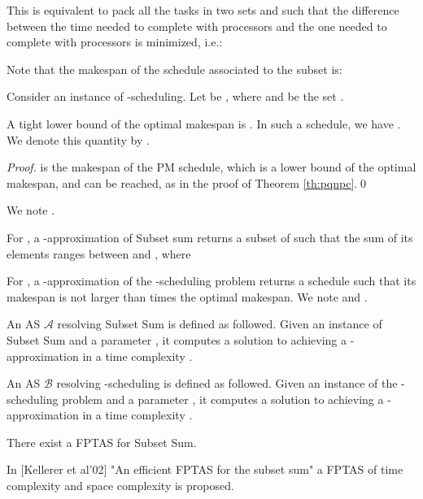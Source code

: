\documentclass{llncs}
\newcommand{\A}{\ensuremath{\mathcal A}\xspace}
\newcommand{\B}{\ensuremath{\mathcal B}\xspace}
\newcommand{\ek}{\varepsilon_{\kappa}}
\begin{document}
This is equivalent to pack all the tasks in two sets  and  such that the difference between the time needed to complete  with  processors and the one needed to complete  with  processors is minimized, i.e.:




Note that the makespan of the schedule associated to the subset  is:





Consider an instance of -scheduling. Let  be , where  and  be the set .


\begin{lemma}
A tight lower bound of the optimal makespan is . In such a schedule, we have . We denote this quantity by .
\end{lemma}

\begin{proof}
 is the makespan of the PM schedule, which is a lower bound of the optimal makespan, and can be reached, as in the proof of Theorem \ref{th:pqnpc}.\qed
\end{proof}

We note .


For , a -approximation of {\sc Subset sum} returns a subset  of  such that the sum of its elements ranges between  and , where 

For , a -approximation of the -scheduling problem returns a schedule such that its makespan is not larger than  times the optimal makespan.
We note  and .

An AS \A resolving {\sc Subset Sum} is defined as followed. Given an instance  of {\sc Subset Sum} and a parameter , it computes a solution to  achieving a -approximation in a time complexity . 

An AS \B resolving -scheduling is defined as followed. Given an instance  of the -scheduling problem and a parameter , it computes a solution to  achieving a -approximation in a time complexity .

\newcommand{\mtgamrap}{\max\left(3,\left\lceil\frac{1}{\ek}-4\right\rceil\right)}

\begin{remark}
There exist a FPTAS for {\sc Subset Sum}.



In [Kellerer et al'02] "An efficient FPTAS for the subset sum" a FPTAS of time complexity  and space complexity  is proposed.

\end{remark}
\end{document}
